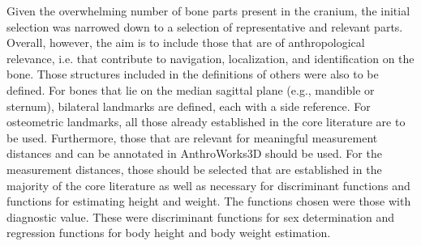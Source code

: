 \documentclass[sw]{iosart2x}
\newcommand{\aw}{AnthroWorks3D}
\begin{document}
%
%
Given the overwhelming number of bone parts present in the cranium, the initial selection was narrowed down to a selection of representative and relevant parts.
Overall, however, the aim is to include those that are of anthropological relevance, i.e. that contribute to navigation, localization, and identification on the bone.
Those structures included in the definitions of others were also to be defined.
For bones that lie on the median sagittal plane (e.g., mandible or sternum), bilateral landmarks are defined, each with a side reference.
For osteometric landmarks, all those already established in the core literature are to be used.
Furthermore, those that are relevant for meaningful measurement distances and can be annotated in \aw{} should be used.
For the measurement distances, those should be selected that are established in the majority of the core literature as well as necessary for discriminant functions and functions for estimating height and weight.
The functions chosen were those with diagnostic value.
These were discriminant functions for sex determination and regression functions for body height and body weight estimation.
\end{document}
